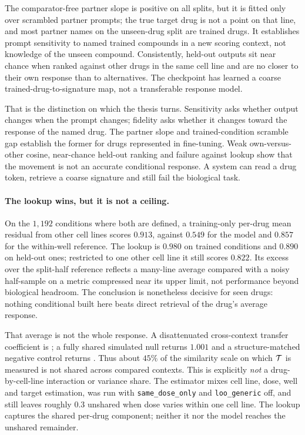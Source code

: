 The comparator-free partner slope is positive on all splits, but it is fitted only over scrambled
partner prompts; the true target drug is not a point on that line, and most partner names on the
unseen-drug split are trained drugs. It establishes prompt sensitivity to named trained compounds in
a new scoring context, not knowledge of the unseen compound. Consistently, held-out outputs sit near
chance when ranked against other drugs in the same cell line and are no closer to their own response
than to alternatives. The checkpoint has learned a coarse trained-drug-to-signature map, not a
transferable response model.

That is the distinction on which the thesis turns. Sensitivity asks whether output changes when the
prompt changes; fidelity asks whether it changes toward the response of the named drug. The partner
slope and trained-condition scramble gap establish the former for drugs represented in fine-tuning.
Weak own-versus-other cosine, near-chance held-out ranking and failure against lookup show that the
movement is not an accurate conditional response. A system can read a drug token, retrieve a coarse
signature and still fail the biological task.

\paragraph{The lookup wins, but it is not a ceiling.} On the $1{,}192$ conditions where both are
defined, a training-only per-drug mean residual from other cell lines scores $0.913$, against
$0.549$ for the model and $0.857$ for the within-well reference. The lookup is $0.980$ on trained
conditions and $0.890$ on held-out ones; restricted to one other cell line it still scores $0.822$.
Its excess over the split-half reference reflects a many-line average compared with a noisy
half-sample on a metric compressed near its upper limit, not performance beyond biological
headroom. The conclusion is nonetheless decisive for seen drugs: nothing conditional built here
beats direct retrieval of the drug's average response.

That average is not the whole response. A disattenuated cross-context transfer coefficient is
; a fully shared simulated null returns $1.001$ and a
structure-matched negative control returns . Thus about $45\%$ of the
similarity scale on which $\mathcal{T}$ is measured is not shared across compared contexts. This is
explicitly \emph{not} a drug-by-cell-line interaction or variance share. The estimator mixes cell
line, dose, well and target estimation, was run with \texttt{same\_dose\_only} and
\texttt{loo\_generic} off, and still leaves roughly $0.3$ unshared when dose varies within one cell
line. The lookup captures the shared per-drug component; neither it nor the model reaches the
unshared remainder.

